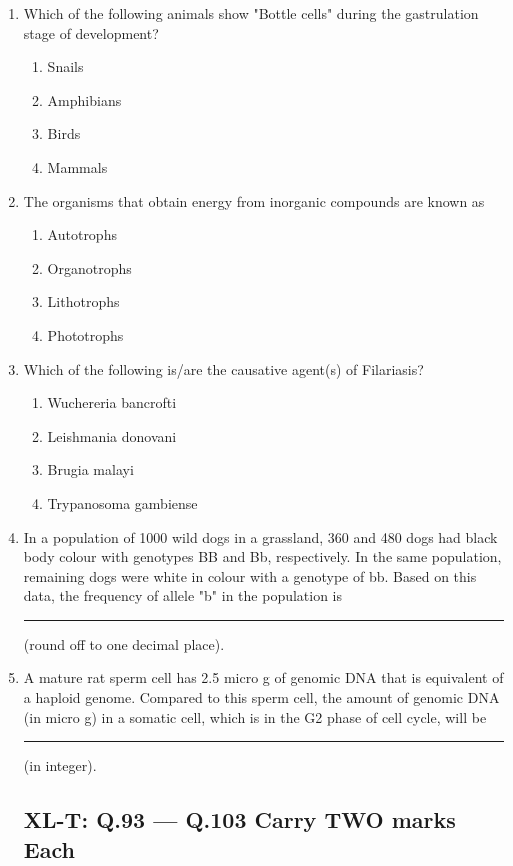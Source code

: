 \documentclass[journal,12pt,onecolumn]{IEEEtran}
\begin{document}
\begin{enumerate}
    \item Which of the following animals show "Bottle cells" during the gastrulation stage of development?
    \begin{enumerate}
        \item Snails
        \item Amphibians
        \item Birds
        \item Mammals
    \end{enumerate}

    \item The organisms that obtain energy from inorganic compounds are known as
    \begin{enumerate}
        \item Autotrophs
        \item Organotrophs
        \item Lithotrophs
        \item Phototrophs
    \end{enumerate}

    \item Which of the following is/are the causative agent(s) of Filariasis?
    \begin{enumerate}
        \item Wuchereria bancrofti
        \item Leishmania donovani
        \item Brugia malayi
        \item Trypanosoma gambiense
    \end{enumerate}

    \item In a population of 1000 wild dogs in a grassland, 360 and 480 dogs had black body colour with genotypes BB and Bb, respectively. In the same population, remaining dogs were white in colour with a genotype of bb. Based on this data, the frequency of allele "b" in the population is \rule{1 cm}{0.15 mm} (round off to one decimal place).

    \item A mature rat sperm cell has 2.5 micro g of genomic DNA that is equivalent of a haploid genome. Compared to this sperm cell, the amount of genomic DNA (in micro g) in a somatic cell, which is in the G2 phase of cell cycle, will be \rule{1 cm}{0.15 mm} (in integer).

\subsection*{XL-T: Q.93 --- Q.103 Carry TWO marks Each}


\end{enumerate}
\end{document}
